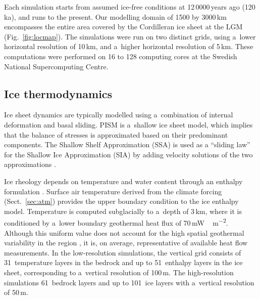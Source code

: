 \documentclass[tc, manuscript]{copernicus}
\begin{document}
      Each simulation starts from assumed ice-free conditions at
      12\,0000\,\unit{years} ago (120\,\unit{ka}), and runs to the
      present. Our modelling domain of 1500 by 3000\,\unit{km} encompasses
      the entire area covered by the Cordilleran ice sheet at the LGM
      (Fig.~\ref{fig:locmap}). The simulations were run on two distinct
      grids, using a~lower horizontal resolution of 10\,\unit{km}, and
      a~higher horizontal resolution of 5\,\unit{km}. These computations
      were performed on 16 to 128 computing cores at the Swedish National
      Supercomputing Centre.

\subsection{Ice thermodynamics}
\label{sec:icedyn}

      Ice sheet dynamics are typically modelled using a~combination of
      internal deformation and basal sliding. PISM is a~shallow ice sheet
      model, which implies that the balance of stresses is approximated
      based on their predominant components. The Shallow Shelf Approximation
      (SSA) is used as a ``sliding law'' for the Shallow Ice Approximation
      (SIA) by adding velocity solutions of the two approximations
      \citep[Eqs.~7--9 and 15]{Bueler.Brown.2009, Winkelmann.etal.2011}.

      Ice rheology depends on temperature and water content through an
      enthalpy formulation \citep{Aschwanden.etal.2012}. Surface air
      temperature derived from the climate forcing (Sect.~\ref{sec:atm})
      provides the upper boundary condition to the ice enthalpy
      model. Temperature is computed subglacially to a~depth of
      3\,\unit{km}, where it is conditioned by a~lower boundary geothermal
      heat flux of 70\,\unit{mW\,m^{-2}}. Although this uniform value does
      not account for the high spatial geothermal variability in the region
      \citep{Blackwell.Richards.2004}, it is, on average, representative of
      available heat flow measurements. In the low-resolution simulations,
      the vertical grid consists of 31~temperature layers in the bedrock and
      up to 51~enthalpy layers in the ice sheet, corresponding to a~vertical
      resolution of 100\,\unit{m}. The high-resolution simulations
      61~bedrock layers and up to 101~ice layers with a~vertical resolution
      of 50\,\unit{m}.
\end{document}
